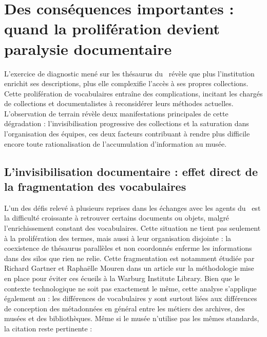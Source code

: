 \section{\label{II-A-2}Des conséquences importantes : quand la prolifération devient paralysie documentaire}

L’exercice de diagnostic mené sur les thésaurus du \mae~révèle que plus l’institution enrichit ses descriptions, plus elle complexifie l’accès à ses propres collections. Cette prolifération de vocabulaires entraîne des complications, incitant les chargés de collections et documentalistes à reconsidérer leurs méthodes actuelles. L’observation de terrain révèle deux manifestations principales de cette dégradation : l’invisibilisation progressive des collections et la saturation dans l’organisation des équipes, ces deux facteurs contribuant à rendre plus difficile encore toute rationalisation de l’accumulation d’information au musée.

\subsection{L’invisibilisation documentaire : effet direct de la fragmentation des vocabulaires}

L’un des défis relevé à plusieurs reprises dans les échanges avec les agents du \mae~est la difficulté croissante à retrouver certains documents ou objets, malgré l’enrichissement constant des vocabulaires. Cette situation ne tient pas seulement à la prolifération des termes, mais aussi à leur organisation disjointe : la coexistence de thésaurus parallèles et non coordonnés enferme les informations dans des silos que rien ne relie. Cette fragmentation est notamment étudiée par Richard Gartner et Raphaëlle Mouren dans un article sur la méthodologie mise en place pour éviter ces écueils à la Warburg Institute Library. Bien que le contexte technologique ne soit pas exactement le même, cette analyse s’applique également au \mae : les différences de vocabulaires y sont surtout liées aux différences de conception des métadonnées en général entre les métiers des archives, des musées et des bibliothèques. Même si le musée n’utilise pas les mêmes standards, la citation reste pertinente :  

